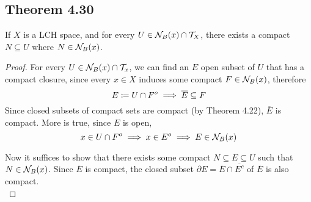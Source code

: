 \documentclass[../../main.tex]{subfiles}
\begin{document}
\subsection{Theorem 4.30}
\begin{wts}
    If $X$ is a LCH space, and for every $U\in\mathcal{N}_B({x})\cap\mathcal{T}_X$, there exists a compact $N\subseteq U$ where $N\in\mathcal{N}_B({x})$.
\end{wts}
\renewcommand{\oe}{\overline{E}}
\begin{proof}
    For every $U\in \mathcal{N}_B({x})\cap\mathcal{T}_x$, we can find an $E$ open subset of $U$ that has a compact closure, since every $x\in X$ induces some compact $F\in\mathcal{N}_B({x})$, therefore
    \[
    E\coloneqq U\cap F^o\implies \overline{E}\subseteq F
    \]
    Since closed subsets of compact sets are compact (by Theorem 4.22), $\overline{E}$ is compact. More is true, since $E$ is open,
    \[
    x\in U\cap F^o\implies x\in E^o\implies E\in\mathcal{N}_B({x})
    \]
    
    
    
    Now it suffices to show that there exists some compact $N\subseteq E\subseteq U$ such that $N\in\mathcal{N}_B({x})$. Since $\oe$ is compact, the closed subset $\partial E = \oe\cap\overline{E^c}$ of $\oe$ is also compact.\\
    

\end{proof}
\end{document}
